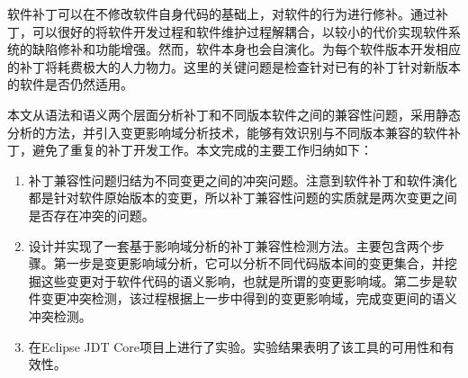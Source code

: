 

\begin{cabstract} 
	软件补丁可以在不修改软件自身代码的基础上，对软件的行为进行修补。通过补丁，可以很好的将软件开发过程和软件维护过程解耦合，以较小的代价实现软件系统的缺陷修补和功能增强。然而，软件本身也会自演化。为每个软件版本开发相应的补丁将耗费极大的人力物力。这里的关键问题是检查针对已有的补丁针对新版本的软件是否仍然适用。
	
	本文从语法和语义两个层面分析补丁和不同版本软件之间的兼容性问题，采用静态分析的方法，并引入变更影响域分析技术，能够有效识别与不同版本兼容的软件补丁，避免了重复的补丁开发工作。本文完成的主要工作归纳如下：
	
	\begin{enumerate}
		\item 补丁兼容性问题归结为不同变更之间的冲突问题。注意到软件补丁和软件演化都是针对软件原始版本的变更，所以补丁兼容性问题的实质就是两次变更之间是否存在冲突的问题。
		\item 设计并实现了一套基于影响域分析的补丁兼容性检测方法。主要包含两个步骤。第一步是变更影响域分析，它可以分析不同代码版本间的变更集合，并挖掘这些变更对于软件代码的语义影响，也就是所谓的变更影响域。第二步是软件变更冲突检测，该过程根据上一步中得到的变更影响域，完成变更间的语义冲突检测。
		\item 在Eclipse JDT Core项目上进行了实验。实验结果表明了该工具的可用性和有效性。
	\end{enumerate}
	
%	
%	
\end{cabstract}

